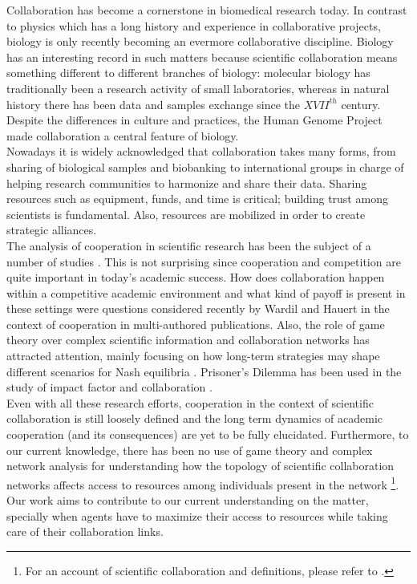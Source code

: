 \documentclass[11pt]{article}
\begin{document}
  

Collaboration has become a cornerstone in biomedical research today.
In contrast to physics which has a long history and experience in
collaborative projects, biology is only recently becoming an evermore
collaborative discipline\cite{Vermeulen2013}. Biology has an
interesting record in such matters because scientific collaboration
means something different to different branches of biology: molecular
biology has traditionally been a research activity of small
laboratories\cite{KnorrCetina1999,Strasser2006}, whereas in natural
history there has been data and samples exchange since the $XVII^{th}$
century\cite{Muller2012,Strasser2012}. Despite the differences in
culture and practices, the Human Genome Project made collaboration a
central feature of biology.\\


Nowadays it is widely acknowledged that collaboration takes many
forms, from sharing of biological samples and biobanking to
international groups in charge of helping research communities to
harmonize and share their data. Sharing resources such as equipment,
funds, and time is critical; building trust among scientists is
fundamental. Also, resources are mobilized in order to create strategic alliances.\\


The analysis of cooperation in scientific research has been the subject of a
number of studies
\cite{Vermeulen2013,Newman2001,Newman2004,Elango2012,HernandezLemus2013,Strasser2006,Strasser2012}. This
is not surprising since cooperation and competition are quite important in
today's academic success. How does collaboration happen within a competitive
academic environment and what kind of payoff is present in these settings were
questions considered recently by Wardil and Hauert \cite{Wardil2015} in the
context of cooperation in multi-authored publications. Also, the role of game
theory over complex scientific information and collaboration networks has
attracted attention, mainly focusing on how long-term strategies may shape
different scenarios for Nash equilibria \cite{hanauske2012}. Prisoner's Dilemma
has been used in the study of impact factor and collaboration
\cite{Hara_etal_2002,Lieberman_etal_2005}. \\  

Even with all these research efforts, cooperation in the context of
scientific collaboration is still loosely defined and the long term
dynamics of academic cooperation (and its consequences) are yet to be
fully elucidated. Furthermore, to our current knowledge, there has
been no use of game theory and complex network analysis for
understanding how the topology of scientific collaboration networks
affects access to resources among individuals present in the network
\footnote{For an account of scientific collaboration and definitions,
  please refer to \cite{Sonnenwald2007}.}. Our work aims to contribute
to our current understanding on the matter, specially when agents have
to maximize their access to resources while taking care of their collaboration links.\\
\end{document}
